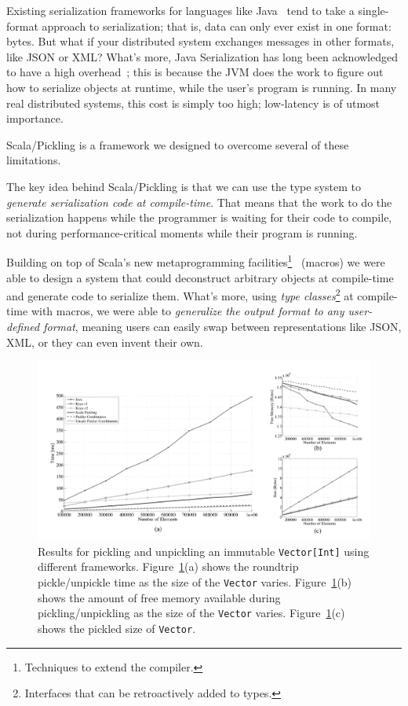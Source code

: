 \documentclass[acmtocl]{acmtrans2m}
\begin{document}
Existing serialization frameworks for languages like
Java~\cite{JavaSerialization} tend to take a single-format approach to
serialization; that is, data can only ever exist in one format: bytes. But
what if your distributed system exchanges messages in other formats, like JSON
or XML? What's more, Java Serialization has long been acknowledged to have a
high overhead~\cite{JavaSlow1, Javaslow2}; this is because the JVM does the
work to figure out how to serialize objects at runtime, while the user's
program is running. In many real distributed systems, this cost is simply too
high; low-latency is of utmost importance.

Scala/Pickling is a framework we designed to overcome several of these
limitations.

The key idea behind Scala/Pickling is that we can use the type system to
\textit{generate serialization code at compile-time}. That means that the work
to do the serialization happens while the programmer is waiting for their code
to compile, not during performance-critical moments while their program is
running.

Building on top of Scala's new metaprogramming facilities\footnote{Techniques
to extend the compiler.}~\cite{ScalaMacros} (macros) we were able to design a
system that could deconstruct arbitrary objects at compile-time and generate
code to serialize them. What's more, using \textit{type
classes}\footnote{Interfaces that can be retroactively added to types.} at
compile-time with macros, we were able to \textit{generalize the output format
to any user-defined format}, meaning users can easily swap between
representations like JSON, XML, or they can even invent their own.

\begin{figure}[t!]
 \centering
 \includegraphics[width=\textwidth]{travInt-all.pdf}
 \caption{\footnotesize Results for pickling and unpickling an immutable
   \texttt{Vector[Int]} using different frameworks. Figure~\ref{fig:results-vector}(a) shows the roundtrip pickle/unpickle time as the size of the \texttt{Vector} varies. Figure~\ref{fig:results-vector}(b) shows the amount of free memory available during pickling/unpickling as the size of the \texttt{Vector} varies. Figure~\ref{fig:results-vector}(c) shows the pickled size of \texttt{Vector}.}
 \label{fig:results-vector}
\end{figure}
\end{document}
